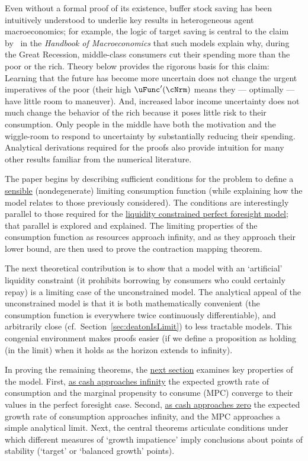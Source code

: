 \documentclass[BufferStockTheory]{subfiles}
\begin{document}
\hypertarget{KMP}{} Even without a formal proof of its existence, buffer stock saving has been intuitively understood to underlie key results in heterogeneous agent macroeconomics; for example, the logic of target saving is central to the claim by~\cite{kmpHandbook} in the \textit{Handbook of Macroeconomics} that such models explain why, during the Great Recession, middle-class consumers cut their spending more than the poor or the rich.  Theory below provides the rigorous basis for this claim:  Learning that the future has become more uncertain does not change the urgent imperatives of the poor (their high $\uFunc^{\prime}(\cNrm)$ means they --- optimally --- have little room to maneuver).  And, increased labor income uncertainty does not much change the behavior of the rich because it poses little risk to their consumption.  Only people in the middle have both the motivation and the wiggle-room to respond to uncertainty by substantially reducing their spending.  Analytical derivations required for the proofs also provide intuition for many other results familiar from the numerical literature.

The paper begins by describing sufficient conditions for the problem to define a \hyperlink{sensible}{sensible} (nondegenerate) limiting consumption function (while explaining how the model relates to those previously considered).  The conditions are interestingly parallel to those required for the \hyperlink{Factors-Defined-And-Compared}{liquidity constrained perfect foresight model}; that parallel is explored and explained.  The limiting properties of the consumption function as resources approach infinity, and as they approach their lower bound, are then used to prove the contraction mapping theorem.

The next theoretical contribution is to show that a model with an `artificial' liquidity constraint (it prohibits borrowing by consumers who could certainly repay) is a limiting case of the unconstrained model.  The analytical appeal of the unconstrained model is that it is both mathematically convenient (the consumption function is everywhere twice continuously differentiable), and arbitrarily close (cf.\ Section~\ref{sec:deatonIsLimit}) to less tractable models. This congenial environment makes proofs easier (if we define a proposition as holding (in the limit) when it holds as the horizon extends to infinity).

In proving the remaining theorems, the \hyperlink{AnalysisoftheConvergedConsumptionFunction}{next section} examines key properties of the model. First, \hyperlink{LimitsAsmtToInfty}{as cash approaches infinity} the expected growth rate of consumption and the marginal propensity to consume (MPC) converge to their values in the perfect foresight case. Second, \hyperlink{LimitsAsmtToZero}{as cash approaches zero} the expected growth rate of consumption approaches infinity, and the MPC approaches a simple analytical limit.  Next, the central theorems articulate conditions under which different measures of `growth impatience' imply conclusions about points of stability (`target' or `balanced growth' points).
\end{document}
